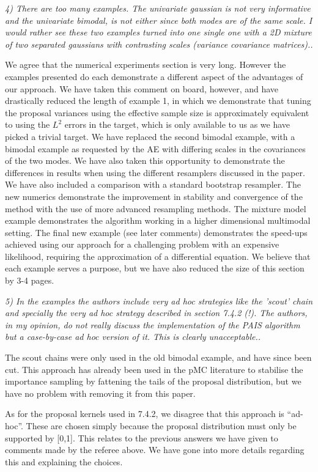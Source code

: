 \documentclass{article}
\newcommand{\comment}[2]{\vspace{0.6cm}{\bf Comment:} {\it #1.}

\vspace{0.3cm}{\bf Answer:} #2}
\begin{document}
\comment{4) There are too many examples. The univariate gaussian is not very informative and the univariate bimodal, is not either since both modes are of the same scale. I would rather see these two examples turned into one single one with a 2D mixture of two separated gaussians with contrasting scales (variance covariance matrices).}{We agree that the numerical experiments section is very long. However the examples presented do each demonstrate a different aspect of the advantages of our approach. We have taken this comment on board, however, and have drastically reduced the length of example 1, in which we demonstrate that tuning the proposal variances using the effective sample size is approximately equivalent to using the $L^2$ errors in the target, which is only available to us as we have picked a trivial target. We have replaced the second bimodal example, with a bimodal example as requested by the AE with differing scales in the covariances of the two modes. We have also taken this opportunity to demonstrate the differences in results when using the different resamplers discussed in the paper. We have also included a comparison with a standard bootstrap resampler. The new numerics demonstrate the improvement in stability and convergence of the method with the use of more advanced resampling methods. The mixture model example demonstrates the algorithm working in a higher dimensional multimodal setting. The final new example (see later comments) demonstrates the speed-ups achieved using our approach for a challenging problem with an expensive likelihood, requiring the approximation of a differential equation. We believe that each example serves a purpose, but we have also reduced the size of this section by 3-4 pages.}

\comment{5) In the examples the authors include very ad hoc strategies like the 'scout' chain and specially the very ad hoc strategy described in section 7.4.2 (!). The authors, in my opinion, do not really discuss the implementation of the PAIS algorithm but a case-by-case ad hoc version of it. This is clearly unacceptable.}{The scout chains were only used in the old bimodal example, and have since been cut. This approach has already been used in the pMC literature to stabilise the importance sampling by fattening the tails of the proposal distribution, but we have no problem with removing it from this paper.

  As for the proposal kernels used in 7.4.2, we disagree that this approach is ``ad-hoc''. These are chosen simply because the proposal distribution must only be supported by [0,1]. This relates to the previous answers we have given to comments made by the referee above. We have gone into more details regarding this and explaining the choices.}
\end{document}
